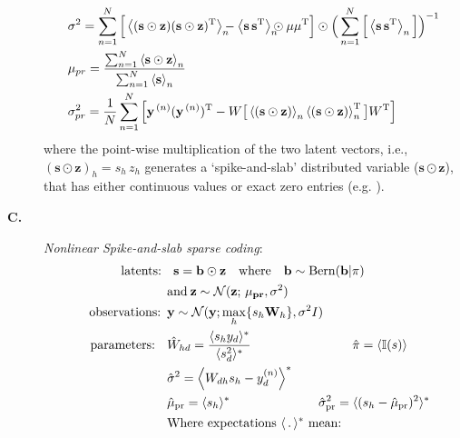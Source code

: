 \documentclass[12pt]{article}
\newcommand{\One}{I}
\renewcommand{\vec}[1]{{\mathbf{#1}}}
\newcommand{\E}[1]{\left\langle{}#1\right\rangle} %
\newcommand{\pr}{\mathrm{pr}}
\newcommand{\sVec}{\vec{s}}
\newcommand{\zVec}{\vec{z}}
\newcommand{\yVecN}{\vec{y}^{\,(n)}}
\newcommand{\muVec}{\vec{\mu}}
\newcommand{\TT}{\mathrm{T}}
\newcommand{\ssb}{\hspace{-2mm}}
\begin{document}
\begin{description}
\begin{align}
%
&\rev{\sigma^2} =
    \sum_{n=1}^{N} \Big[\E{(\sVec\odot\zVec)(\sVec\odot\zVec)^{\TT}}_n 
    \ssb -  \E{\sVec\,\sVec^{\TT}}_n \ssb \odot \muVec\muVec^{\TT} \Big] 
    \odot \Big(\sum_{n=1}^{N}\Big[\E{\sVec\,\sVec^{\TT}}_n \Big]\Big)^{-1} \nonumber\\
%
&\rev{\mu_{pr}}  = \frac{\sum_{n=1}^{N} \E{\sVec\odot\zVec}_n}{\sum_{n=1}^{N}\E{\sVec}_n}  \nonumber\\
%
&\rev{\sigma^{2}_{pr}} = \frac{1}{N}\sum_{n=1}^{N}\Big[ \yVecN(\yVecN)^{\TT}
        - W\big[\E{(\sVec\odot\zVec)}_n\E{(\sVec\odot\zVec)}_n^{\TT}\big]W^{\TT}\Big]  \nonumber
\end{align}
where the point-wise multiplication of the two latent vectors, i.e., $(\vec{s}\odot\vec{z})_h = s_h\,z_h$
generates a `spike-and-slab' distributed variable ($\vec{s}\odot\vec{z}$), that has either continuous values or exact zero entries (e.g. \citep{TitsiasGredilla2011,GoodfellowEtAl2013,SheikhEtAl2014}).
%
\item[\textbf{C.}] \textit{Nonlinear Spike-and-slab sparse coding}:
\vspace{-.2cm}
%
\begin{align}\label{eq:ssmca}
\text{latents: } & \,\,\,\vec{s} = \vec{b}\odot\vec{z} \nonumber
\quad\mathrm{where}\quad \vec{b}\sim \mathrm{Bern}(\vec{b} | \pi)\nonumber\\
\:&\mathrm{and} \:
\vec{z} \sim \mathcal{N}(\vec{z};\,\vec{\mu_{pr}} , \sigma^2) \nonumber\\ 
 \text{observations:}\,\,\, &\vec{y} \sim \mathcal{N}(\vec{y}; \max_{h}\{s_h\vec{W}_{h}\}, \sigma^2\One)\nonumber\\
%
\rev{\text{\quad parameters: }} \,\,\,\nonumber
%
&\rev{\hat{W}_{hd}}   = \frac{\langle s_h y_d \rangle^*}{\langle s_d^2 \rangle^*} 
 \text{\quad}\text{\quad}\text{\quad}\text{\quad}\text{\quad}\text{\quad}
\text{\quad}\text{\quad}\rev{\hat{\pi}} = \langle \mathbb{I}(s) \rangle  \text{\quad}\nonumber\\
%
&\rev{\hat{\sigma}^2} = \left\langle W_{dh} s_h - y_d^{(n)}\right\rangle^\ast \nonumber\\
%
&\rev{\hat{\mu}_{\pr}} = \langle s_h \rangle^* 
 \text{\quad}\text{\quad}\text{\quad}\text{\quad}\text{\quad}\text{\quad}\text{\quad}
\rev{\hat{\sigma}^2_{\pr}} = \langle (s_h - \hat{\mu}_{\pr})^2 \rangle^* \nonumber\\
&\rev{\text{Where expectations $\langle \,.\, \rangle^*$ mean:}}\nonumber\\

\end{align}
\end{description}
\end{document}
